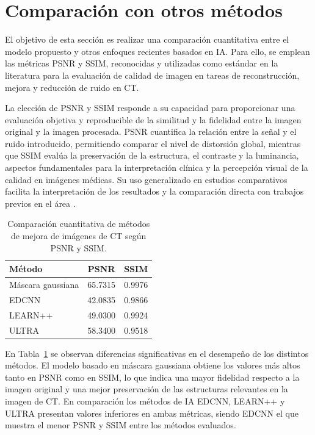 \section{Comparación con otros métodos}

El objetivo de esta sección es realizar una comparación cuantitativa entre el modelo propuesto y otros enfoques recientes basados en IA. Para ello, se emplean las métricas PSNR y SSIM, reconocidas y utilizadas como estándar en la literatura para la evaluación de calidad de imagen en tareas de reconstrucción, mejora y reducción de ruido en CT.

La elección de PSNR y SSIM responde a su capacidad para proporcionar una evaluación objetiva y reproducible de la similitud y la fidelidad entre la imagen original y la imagen procesada. PSNR cuantifica la relación entre la señal y el ruido introducido, permitiendo comparar el nivel de distorsión global, mientras que SSIM evalúa la preservación de la estructura, el contraste y la luminancia, aspectos fundamentales para la interpretación clínica y la percepción visual de la calidad en imágenes médicas. Su uso generalizado en estudios comparativos facilita la interpretación de los resultados y la comparación directa con trabajos previos en el área \cite{ImageProcessingBook, wang2004image}.

\begin{table}[h]
    \centering
    \caption{Comparación cuantitativa de métodos de mejora de imágenes de CT según PSNR y SSIM.}
    \label{tab:metodos_vs_metricas}
    \begin{tabular}{|l|c|c|}
        \hline
        \textbf{Método} & \textbf{PSNR} & \textbf{SSIM} \\
        \hline
        Máscara gaussiana & 65.7315 & 0.9976 \\
        EDCNN             & 42.0835 & 0.9866 \\
        LEARN++           & 49.0300 & 0.9924 \\
        ULTRA             & 58.3400 & 0.9518 \\
        \hline
    \end{tabular}
\end{table}

En Tabla~\ref{tab:metodos_vs_metricas} se observan diferencias significativas en el desempeño de los distintos métodos. El modelo basado en máscara gaussiana obtiene los valores más altos tanto en PSNR como en SSIM, lo que indica una mayor fidelidad respecto a la imagen original y una mejor preservación de las estructuras relevantes en la imagen de CT. En comparación los métodos de IA EDCNN, LEARN++ y ULTRA presentan valores inferiores en ambas métricas, siendo EDCNN el que muestra el menor PSNR y SSIM entre los métodos evaluados.

